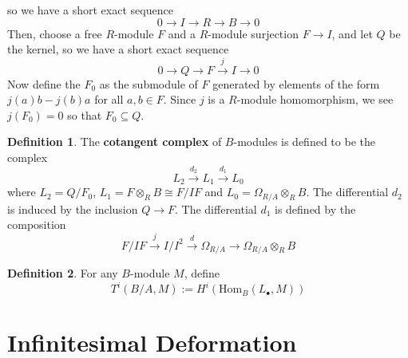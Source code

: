 \documentclass{article}
\newcommand{\Hom}{\textrm{Hom}}
\theoremstyle{definition}
\theoremstyle{definition}
\newtheorem{definition}{Definition}[theorem]
\theoremstyle{definition}
\theoremstyle{definition}
\theoremstyle{definition}
\theoremstyle{definition}
\theoremstyle{definition}
\begin{document}
so we have a short exact sequence
\[0\to I\to R\to B\to 0\]
Then, choose a free $R$-module $F$ and a $R$-module surjection $F\to I$, and let $Q$ be the kernel, so we have a short exact sequence
\[0\to Q\to F\xrightarrow{j} I\to 0\]
Now define the $F_0$ as the submodule of $F$ generated by elements of the form $j(a)b-j(b)a$ for all $a,b\in F$. Since $j$ is a $R$-module homomorphism, we see $j(F_0)=0$ so that $F_0\subseteq Q$. 
\begin{definition}
	The \textbf{cotangent complex} of $B$-modules is defined to be the complex
	\[L_2\xrightarrow{d_2}L_1\xrightarrow{d_1}L_0\]
where $L_2=Q/F_0$, $L_1=F\otimes_R B\cong F/IF$ and $L_0=\Omega_{R/A}\otimes_R B$. The differential $d_2$ is induced by the inclusion $Q\to F$. The differential $d_1$ is defined by the composition 
\[F/IF\xrightarrow{j}I/I^2\xrightarrow{d}\Omega_{R/A}\to \Omega_{R/A}\otimes_R B \]
\end{definition}

\begin{definition}
	For any $B$-module $M$, define 
	\[T^i(B/A,M):= H^i(\Hom_B(L_{\bullet}, M))\]
\end{definition}



\section{Infinitesimal Deformation}
\end{document}
